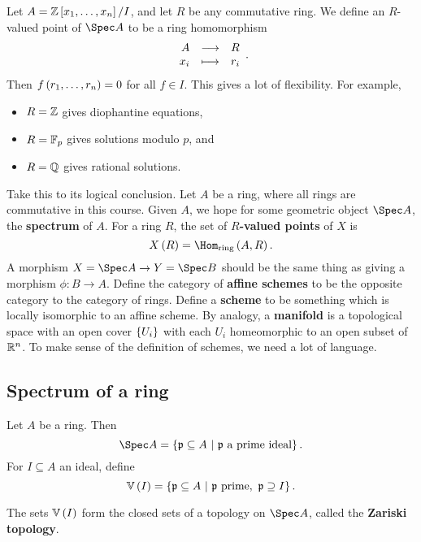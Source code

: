 \pagebreak

\begin{example*}
Let $ A = \ZZ\sbr{x_1, \dots, x_n} / I $, and let $ R $ be any commutative ring. We define an $ R $-valued point of $ \Spec A $ to be a ring homomorphism
$$ \function{A}{R}{x_i}{r_i}. $$
Then $ f\br{r_1, \dots, r_n} = 0 $ for all $ f \in I $. This gives a lot of flexibility. For example,
\begin{itemize}
\item $ R = \mathbb{Z} $ gives diophantine equations,
\item $ R = \mathbb{F}_p $ gives solutions modulo $ p $, and
\item $ R = \mathbb{Q} $ gives rational solutions.
\end{itemize}
\end{example*}

Take this to its logical conclusion. Let $ A $ be a ring, where all rings are commutative in this course. Given $ A $, we hope for some geometric object $ \Spec A $, the \textbf{spectrum} of $ A $. For a ring $ R $, the set of \textbf{$ R $-valued points} of $ X $ is
$$ X\br{R} = \Hom_{\text{ring}}\br{A, R}. $$
A morphism $ X = \Spec A \to Y = \Spec B $ should be the same thing as giving a morphism $ \phi : B \to A $. Define the category of \textbf{affine schemes} to be the opposite category to the category of rings. Define a \textbf{scheme} to be something which is locally isomorphic to an affine scheme. By analogy, a \textbf{manifold} is a topological space with an open cover $ \cbr{U_i} $ with each $ U_i $ homeomorphic to an open subset of $ \mathbb{R}^n $. To make sense of the definition of schemes, we need a lot of language.

\subsection{Spectrum of a ring}

\begin{definition*}
Let $ A $ be a ring. Then
$$ \Spec A = \cbr{\ppp \subseteq A \st \ppp \ \text{a prime ideal}}. $$
For $ I \subseteq A $ an ideal, define
$$ \VV\br{I} = \cbr{\ppp \subseteq A \st \ppp \ \text{prime}, \ \ppp \supseteq I}. $$
\end{definition*}

\begin{proposition}
The sets $ \VV\br{I} $ form the closed sets of a topology on $ \Spec A $, called the \textbf{Zariski topology}.
\end{proposition}

